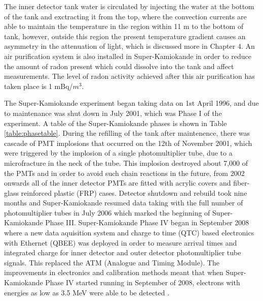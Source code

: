 The inner detector tank water is circulated by injecting the water at the bottom of the tank and exctracting it from the top, where the convection currents are able to maintain the temperature in the region within 11 m to the bottom of tank, however, outside this region the present temperature gradient causes an asymmetry in the attenuation of light, which is discussed more in Chapter 4. 
\newline
 An air purification system is also installed in Super-Kamiokande in order to reduce the amount of radon present which could dissolve into the tank and affect measurements. The level of radon activity achieved after this air purification has taken place is 1 mBq/$m^{3}$.

The Super-Kamiokande experiment began taking data on 1st April 1996, and due to maintenance was shut down in July 2001, which was Phase I of the experiment. A table of the Super-Kamiokande phases is shown in Table \ref{table:phasetable}. During the refilling of the tank after maintenence, there was cascade of PMT implosions that occurred on the 12th of November 2001, which were triggered by the implosion of a single photomultiplier tube, due to a microfracture in the neck of the tube. This implosion destroyed about 7,000 of the PMTs and in order to avoid such chain reactions in the future, from 2002 onwards all of the inner detector PMTs are fitted with acrylic covers and fiber-glass reinforced plastic (FRP) cases. Detector shutdown and rebuild took nine months and Super-Kamiokande resumed data taking with the full number of photomultiplier tubes in July 2006 which marked the beginning of Super-Kamiokande Phase III. Super-Kamiokande Phase IV began in September 2008 where a new data aquisition system and charge to time (QTC) based electronics with Ethernet (QBEE) was deployed in order to measure arrival times and integrated charge for inner detector and outer detector photomultiplier tube signals. This replaced the ATM (Analogue and Timing Module). The improvements in electronics and calibration methods meant that when Super-Kamiokande Phase IV started running in September of 2008, electrons with energies as low as 3.5 MeV were able to be detected \cite{yamada2010commissioning}.

